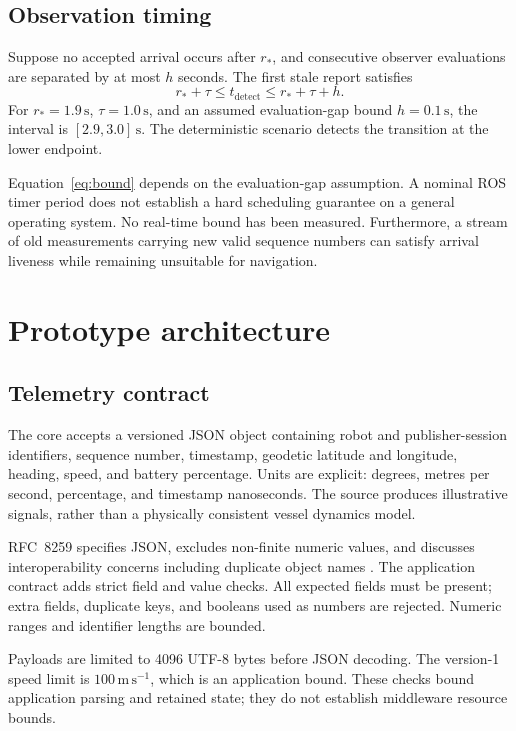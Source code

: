 \documentclass[11pt,a4paper]{article}
\begin{document}
\subsection{Observation timing}
Suppose no accepted arrival occurs after $r_\ast$, and consecutive observer
evaluations are separated by at most $h$ seconds. The first stale report satisfies
\begin{equation}
r_\ast+\tau\leq t_{\mathrm{detect}}\leq r_\ast+\tau+h.
\label{eq:bound}
\end{equation}
For $r_\ast=1.9\,\mathrm{s}$, $\tau=1.0\,\mathrm{s}$, and an assumed evaluation-gap
bound $h=0.1\,\mathrm{s}$, the interval is $[2.9,3.0]\,\mathrm{s}$. The deterministic
scenario detects the transition at the lower endpoint.

Equation~\eqref{eq:bound} depends on the evaluation-gap assumption. A nominal ROS
timer period does not establish a hard scheduling guarantee on a general operating
system. No real-time bound has been measured. Furthermore, a stream of old
measurements carrying new valid sequence numbers can satisfy arrival liveness
while remaining unsuitable for navigation.

\section{Prototype architecture}
\subsection{Telemetry contract}
The core accepts a versioned JSON object containing robot and publisher-session
identifiers, sequence number, timestamp, geodetic latitude and longitude, heading,
speed, and battery percentage. Units are explicit: degrees, metres per second,
percentage, and timestamp nanoseconds. The source produces illustrative signals,
rather than a physically consistent vessel dynamics model.

RFC~8259 specifies JSON, excludes non-finite numeric values, and discusses
interoperability concerns including duplicate object names \cite{rfc8259}.
The application contract adds strict field and value checks. All expected fields
must be present; extra fields, duplicate keys, and booleans used as numbers are
rejected. Numeric ranges and identifier lengths are bounded.

Payloads are limited to 4096 UTF-8 bytes before JSON decoding. The version-1 speed
limit is $100\,\mathrm{m\,s^{-1}}$, which is an application bound. These checks
bound application parsing and retained state; they do not establish middleware
resource bounds.
\end{document}
